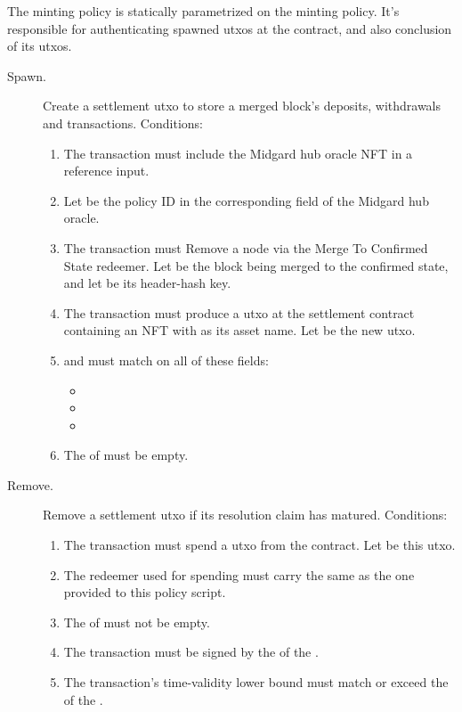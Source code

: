 \documentclass[../midgard.tex]{subfiles}
\begin{document}
The  minting policy is statically parametrized on the  minting policy.
It's responsible for authenticating spawned utxos at the  contract, and also conclusion of its utxos.
\begin{description}
  \item[Spawn.] Create a settlement utxo to store a merged block's deposits, withdrawals and transactions.
    Conditions:
      \begin{enumerate}
        \item The transaction must include the Midgard hub oracle NFT in a reference input.
        \item Let  be the policy ID in the corresponding field of the Midgard hub oracle.
        \item The transaction must Remove a  node via the Merge To Confirmed State redeemer.
          Let  be the block being merged to the confirmed state, and let  be its header-hash key.
        \item The transaction must produce a utxo at the settlement contract containing an NFT with  as its asset name.
          Let  be the new utxo.
        \item {} and  must match on all of these fields:
          \begin{itemize}
            \item {}
            \item {}
            \item {}
          \end{itemize}
        \item The  of  must be empty.
      \end{enumerate}
  \item[Remove.] Remove a settlement utxo if its resolution claim has matured.
    Conditions:
      \begin{enumerate}
        \item The transaction must spend a utxo from the  contract.
          Let  be this utxo.
        \item The redeemer used for spending  must carry the same  as the one provided to this policy script.
        \item The  of  must not be empty.
        \item The transaction must be signed by the  of the .
        \item The transaction's time-validity lower bound must match or exceed the  of the .
      \end{enumerate}
\end{description}
\end{document}

